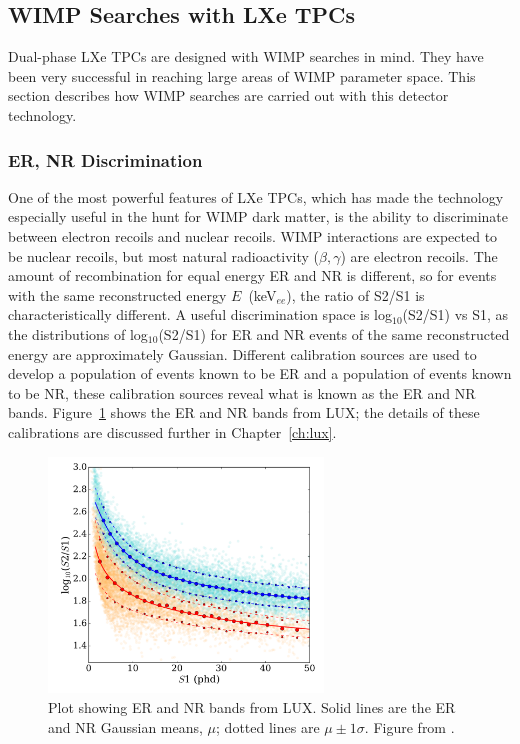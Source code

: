 \subsection{WIMP Searches with LXe TPCs}
Dual-phase \ac{LXe} \ac{TPC}s are designed with \ac{WIMP} searches in mind. They have been very successful in reaching large areas of \ac{WIMP} parameter space. This section describes how \ac{WIMP} searches are carried out with this detector technology.

\subsubsection{ER, NR Discrimination}
\label{sec:er_nr_discrimination}
One of the most powerful features of \ac{LXe} \ac{TPC}s, which has made the technology especially useful in the hunt for \ac{WIMP} dark matter, is the ability to discriminate between electron recoils and nuclear recoils. \ac{WIMP} interactions are expected to be nuclear recoils, but most natural radioactivity ($\beta , \gamma$) are electron recoils. The amount of recombination for equal energy \ac{ER} and \ac{NR} is different, so for events with the same reconstructed energy $E$~(keV$_{ee}$), the ratio of S2/S1 is characteristically different. A useful discrimination space is log$_{10}$(S2/S1) vs S1, as the distributions of log$_{10}$(S2/S1) for \ac{ER} and \ac{NR} events of the same reconstructed energy are approximately Gaussian. Different calibration sources are used to develop a population of events known to be \ac{ER} and a population of events known to be \ac{NR}, these calibration sources reveal what is known as the \ac{ER} and \ac{NR} bands. Figure~\ref{fig:bands} shows the \ac{ER} and \ac{NR} bands from \ac{LUX}; the details of these calibrations are discussed further in Chapter~\ref{ch:lux}. 

\begin{figure}[htbp]
\begin{center}
\includegraphics[width=0.65\textwidth]{figures/lxetpcs/bands.png}
\caption{Plot showing \acs{ER} and \acs{NR} bands from \acs{LUX}. Solid lines are the \acs{ER} and \acs{NR} Gaussian means, $\mu$; dotted lines are $\mu \pm 1 \sigma$. Figure from \cite{LUX:YieldsAndRecombination}. }
\label{fig:bands}
\end{center}
\end{figure}


